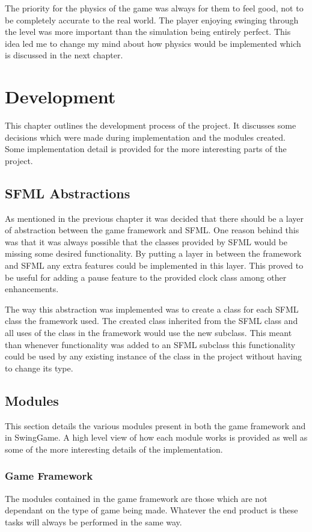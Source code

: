 \documentclass[]{report}
\begin{document}
	The priority for the physics of the game was always for them to feel good, not to be completely accurate to the real world. The player enjoying swinging through the level was more important than the simulation being entirely perfect. This idea led me to change my mind about how physics would be implemented which is discussed in the next chapter.

\chapter{Development}
This chapter outlines the development process of the project. It discusses some decisions which were made during implementation and the modules created. Some implementation detail is provided for the more interesting parts of the project.

	\section{SFML Abstractions}
	As mentioned in the previous chapter it was decided that there should be a layer of abstraction between the game framework and SFML. One reason behind this was that it was always possible that the classes provided by SFML would be missing some desired functionality. By putting a layer in between the framework and SFML any extra features could be implemented in this layer. This proved to be useful for adding a pause feature to the provided clock class among other enhancements.
	
	The way this abstraction was implemented was to create a class for each SFML class the framework used. The created class inherited from the SFML class and all uses of the class in the framework would use the new subclass. This meant than whenever functionality was added to an SFML subclass this functionality could be used by any existing instance of the class in the project without having to change its type.
	
	\section{Modules}
	This section details the various modules present in both the game framework and in SwingGame. A high level view of how each module works is provided as well as some of the more interesting details of the implementation.
		\subsection{Game Framework}
		The modules contained in the game framework are those which are not dependant on the type of game being made. Whatever the end product is these tasks will always be performed in the same way.
\end{document}
